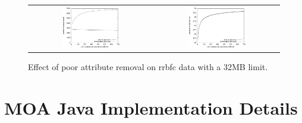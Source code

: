\begin{figure}
\centering
\begin{tabular}{c@{}c}
\includegraphics[width=0.5\textwidth]{figures/pooratt_active} &
\includegraphics[width=0.5\textwidth]{figures/pooratt_acc} \\
\end{tabular}
\caption{Effect of poor attribute removal on {\sc rrbfc} data with a 32MB limit.}
\label{fig:pooratts}
\end{figure}


\section{MOA Java Implementation Details}
\label{sec:javaimpl}



